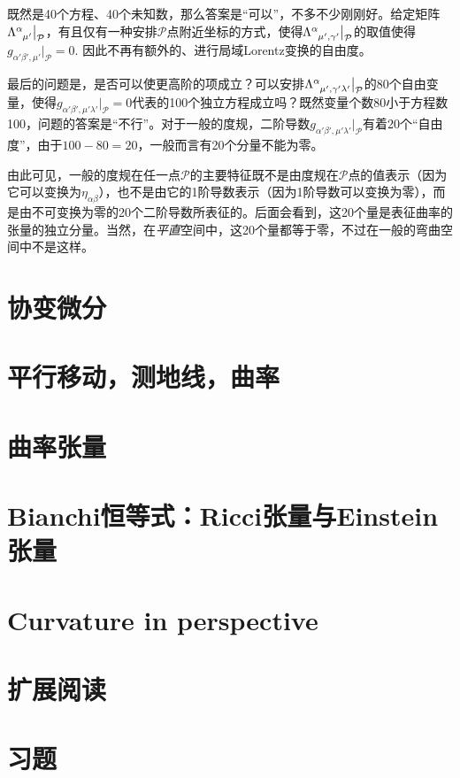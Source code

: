 既然是40个方程、40个未知数，那么答案是“可以”，不多不少刚刚好。给定矩阵$\Lambda\indices{^\alpha_{\mu'}} \big|_{\mathcal{P}}$，有且仅有一种安排$\mathcal{P}$点附近坐标的方式，使得$\Lambda\indices{^\alpha_{\mu' , \gamma'}} \big|_{\mathcal{P}}$的取值使得$g_{\alpha' \beta', \mu'} \big|_{\mathcal{P}} = 0.$ 因此不再有额外的、进行局域Lorentz变换的自由度。

最后的问题是，是否可以使更高阶的项成立？可以安排$\Lambda\indices{^\alpha_{\mu', \gamma' \lambda'}} \big|_{\mathcal{P}}$的80个自由变量，使得$g_{\alpha' \beta', \mu' \lambda'} \big|_{\mathcal{P}} = 0$代表的100个独立方程成立吗？既然变量个数80小于方程数100，问题的答案是“不行”。对于一般的度规，二阶导数$g_{\alpha' \beta', \mu' \lambda'} \big|_{\mathcal{P}}$有着20个“自由度”，由于$100 - 80 = 20$，一般而言有20个分量不能为零。

由此可见，一般的度规在任一点$\mathcal{P}$的主要特征既不是由度规在$\mathcal{P}$点的值表示（因为它可以变换为$\eta_{\alpha \beta}$），也不是由它的1阶导数表示（因为1阶导数可以变换为零），而是由不可变换为零的20个二阶导数所表征的。后面会看到，这20个量是表征曲率的张量的独立分量。当然，在\textit{平直}空间中，这20个量都等于零，不过在一般的弯曲空间中不是这样。


\section{协变微分}
\label{sec6.3}

\section{平行移动，测地线，曲率}
\label{sec6.4}

\section{曲率张量}
\label{sec6.5}

\section{Bianchi恒等式：Ricci张量与Einstein张量}
\label{sec6.6}

\section{Curvature in perspective}
\label{sec6.7}

\section{扩展阅读}
\label{sec6.8}

\section{习题}
\label{sec6.9}